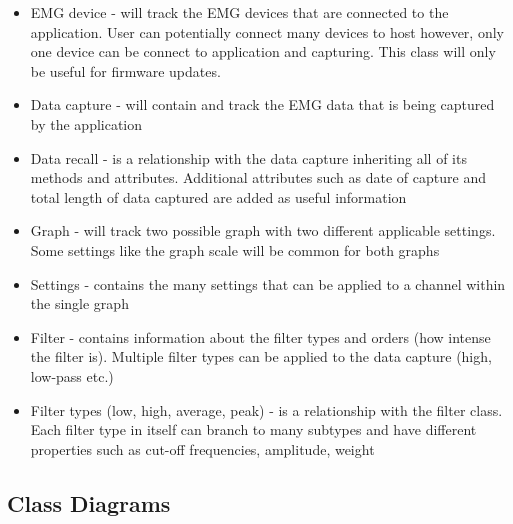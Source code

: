\documentclass[12pt,a4paper]{article}
\begin{document}
\begin{itemize}
	\item EMG device - will track the EMG devices that are connected to the application. User can potentially connect many devices to host however, only one device can be connect to application and capturing.
						This class will only be useful for firmware updates. 
	\item Data capture - will contain and track the EMG data that is being captured by the application
	\item Data recall - is a relationship with the data capture inheriting all of its methods and attributes. 
						Additional attributes such as date of capture and total length of data captured are added as useful information
	\item Graph - will track two possible graph with two different applicable settings. Some settings like the graph scale will be common for both graphs
	\item Settings - contains the many settings that can be applied to a channel within the single graph
	\item Filter - contains information about the filter types and orders (how intense the filter is). Multiple filter types can be applied to the data capture (high, low-pass etc.)
	\item Filter types (low, high, average, peak) - is a relationship with the filter class. Each filter type in itself can branch to many subtypes and have different properties such as cut-off frequencies, amplitude, weight
\end{itemize}

\newpage

\subsection{Class Diagrams}
\end{document}
